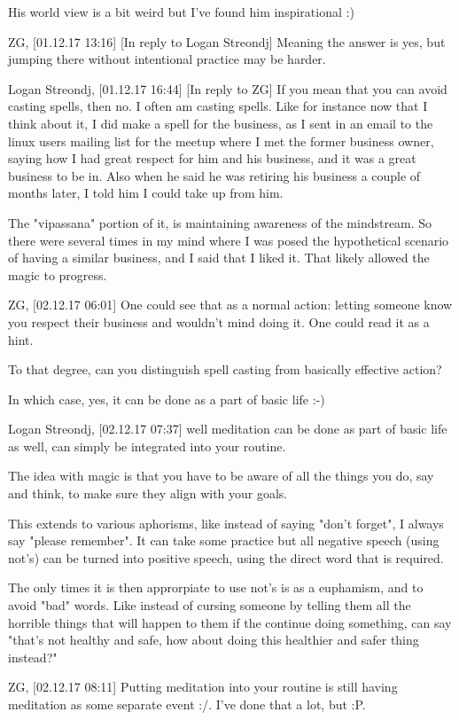 His world view is a bit weird but I've found him inspirational :)

ZG, [01.12.17 13:16]
[In reply to Logan Streondj]
Meaning the answer is yes, but jumping there without intentional practice may be
harder.

Logan Streondj, [01.12.17 16:44]
[In reply to ZG]
If you mean that you can avoid casting spells, then no.  I often am casting
spells.   Like for instance now that I think about it, I did make a spell for
the business, as I sent in an email to the linux users mailing list for the
meetup where I met the former business  owner, saying how I had great respect
for him and his business, and it was a great business to be in.
Also when he said he was retiring his business a couple of months later, I told
him I could take up from him. 

The "vipassana" portion of it, is maintaining awareness of the mindstream. So
there were several times in my mind where I was posed the hypothetical scenario
of having a similar business, and I said that I liked it.  That likely allowed
the magic to progress.

ZG, [02.12.17 06:01]
One could see that as a normal action: letting someone know you respect their
business and wouldn't mind doing it. One could read it as a hint.

To that degree, can you distinguish spell casting from basically effective
action? 

In which case, yes, it can be done as a part of basic life :-)

Logan Streondj, [02.12.17 07:37]
well meditation can be done as part of basic life as well,
can simply be integrated into your routine.

The idea with magic is that you have to be aware of all the things you do, say
and think,
to make sure they align with your goals.   

This extends to various aphorisms, like instead of saying "don't forget", I
always say "please remember".
It can take some practice but all negative speech (using not's) can be turned
into positive speech, using the direct word that is required.

The only times it is then approrpiate to use not's is as a euphamism, and to
avoid "bad" words.
Like instead of cursing someone by telling them all the horrible things that
will happen to them if the continue doing something,
can say "that's not healthy and safe, how about doing this healthier and safer
thing instead?"

ZG, [02.12.17 08:11]
Putting meditation into your routine  is still having meditation as some
separate event :/. I've done that a lot, but :P.

